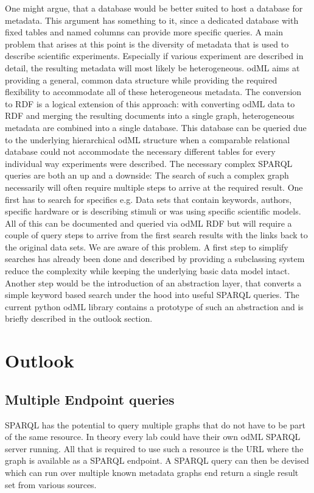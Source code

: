 \documentclass{article}
\begin{document}
One might argue, that a database would be better suited to host a database for metadata. This argument has something to it, since a dedicated database with fixed tables and named columns can provide more specific queries.
A main problem that arises at this point is the diversity of metadata that is used to describe scientific experiments. Especially if various experiment are described in detail, the resulting metadata will most likely be heterogeneous. odML aims at providing a general, common data structure while providing the required flexibility to accommodate all of these heterogeneous metadata. The conversion to RDF is a logical extension of this approach: with converting odML data to RDF and merging the resulting documents into a single graph, heterogeneous metadata are combined into a single database. This database can be queried due to the underlying hierarchical odML structure when a comparable relational database could not accommodate the necessary different tables for every individual way experiments were described.
The necessary complex SPARQL queries are both an up and a downside: The search of such a complex graph necessarily will often require multiple steps to arrive at the required result. One first has to search for specifics e.g. Data sets that contain keywords, authors, specific hardware or is describing stimuli or was using specific scientific models. All of this can be documented and queried via odML RDF but will require a couple of query steps to arrive from the first search results with the links back to the original data sets.
We are aware of this problem. A first step to simplify searches has already been done and described by providing a subclassing system reduce the complexity while keeping the underlying basic data model intact. Another step would be the introduction of an abstraction layer, that converts a simple keyword based search under the hood into useful SPARQL queries. The current python odML library contains a prototype of such an abstraction and is briefly described in the outlook section.

\section{Outlook} \label{sec:outlook}
\subsection{Multiple Endpoint queries} \label{sec:outlook_endpoints}
SPARQL has the potential to query multiple graphs that do not have to be part of the same resource. In theory every lab could have their own odML SPARQL server running. All that is required to use such a resource is the URL where the graph is available as a SPARQL endpoint. A SPARQL query can then be devised which can run over multiple known metadata graphs end return a single result set from various sources.
\end{document}
